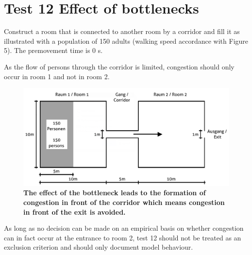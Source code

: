 \section*{Test 12 Effect of bottlenecks}

Construct a room that is connected to another room by a corridor and fill it as illustrated with a population of 150 adults (walking speed accordance with Figure 5). The premovement time is 0 s.

\noindent
As the flow of persons through the corridor is limited, congestion should only occur in room 1 and not in room 2.


\begin{figure}[h]
	\centering
	\includegraphics[scale=0.44]{test_description/Corridor_test_12.png}
	\caption{\footnotesize \textbf{The effect of the bottleneck leads to the formation of congestion in front of the corridor which means congestion in front of the exit is avoided.
}}
\end{figure}

\noindent
As long as no decision can be made on an empirical basis on whether congestion can in fact occur at the entrance to room 2, test 12 should not be treated as an exclusion criterion and should only document model behaviour.
